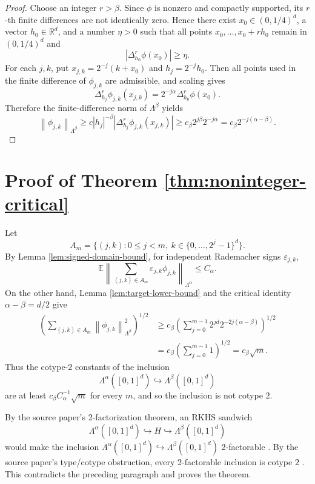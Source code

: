 \documentclass[11pt]{article}
\newcommand{\R}{\mathbb{R}}
\newcommand{\eps}{\varepsilon}
\newcommand{\Lam}{\Lambda}
\newcommand{\norm}[1]{\left\lVert #1\right\rVert}
\newcommand{\abs}[1]{\left\lvert #1\right\rvert}
\begin{document}
\begin{proof}
Choose an integer \(r>\beta\). Since \(\phi\) is nonzero and compactly
supported, its \(r\)-th finite differences are not identically zero. Hence
there exist \(x_0\in(0,1/4)^d\), a vector \(h_0\in\R^d\), and a number
\(\eta>0\) such that all points \(x_0,\ldots,x_0+rh_0\) remain in
\((0,1/4)^d\) and
\[
  \abs{\Delta_{h_0}^r\phi(x_0)}\ge \eta .
\]
For each \(j,k\), put \(x_{j,k}=2^{-j}(k+x_0)\) and
\(h_j=2^{-j}h_0\). Then all points used in the finite difference of
\(\phi_{j,k}\) are admissible, and scaling gives
\[
  \Delta_{h_j}^r\phi_{j,k}(x_{j,k})
  =
  2^{-j\alpha}\Delta_{h_0}^r\phi(x_0).
\]
Therefore the finite-difference norm of \(\Lam^\beta\) yields
\[
  \norm{\phi_{j,k}}_{\Lam^\beta}
  \ge
  c \abs{h_j}^{-\beta}
  \abs{\Delta_{h_j}^r\phi_{j,k}(x_{j,k})}
  \ge
  c_\beta 2^{j\beta}2^{-j\alpha}
  =
  c_\beta 2^{-j(\alpha-\beta)}.
\]
\end{proof}

\section*{Proof of Theorem \ref{thm:noninteger-critical}}

Let
\[
  A_m=\{(j,k):0\le j<m,\ k\in\{0,\ldots,2^j-1\}^d\}.
\]
By Lemma \ref{lem:signed-domain-bound}, for independent Rademacher signs
\(\eps_{j,k}\),
\[
  \mathbb{E}
  \left\|
    \sum_{(j,k)\in A_m}\eps_{j,k}\phi_{j,k}
  \right\|_{\Lam^\alpha}
  \le C_\alpha .
\]
On the other hand, Lemma \ref{lem:target-lower-bound} and the critical
identity \(\alpha-\beta=d/2\) give
\[
\begin{aligned}
  \left(
    \sum_{(j,k)\in A_m}
    \norm{\phi_{j,k}}_{\Lam^\beta}^2
  \right)^{1/2}
  &\ge
  c_\beta
  \left(
    \sum_{j=0}^{m-1}2^{jd}2^{-2j(\alpha-\beta)}
  \right)^{1/2}  \\
  &=
  c_\beta
  \left(
    \sum_{j=0}^{m-1}1
  \right)^{1/2}
  =
  c_\beta\sqrt m .
\end{aligned}
\]
Thus the cotype-2 constants of the inclusion
\[
  \Lam^\alpha([0,1]^d)\hookrightarrow \Lam^\beta([0,1]^d)
\]
are at least \(c_\beta C_\alpha^{-1}\sqrt m\) for every \(m\), and so the
inclusion is not cotype \(2\).

By the source paper's 2-factorization theorem, an RKHS sandwich
\[
  \Lam^\alpha([0,1]^d)\hookrightarrow H
  \hookrightarrow \Lam^\beta([0,1]^d)
\]
would make the inclusion
\(\Lam^\alpha([0,1]^d)\hookrightarrow \Lam^\beta([0,1]^d)\) 2-factorable
\cite[Theorem 6]{SS}. By the source paper's type/cotype obstruction, every
2-factorable inclusion is cotype \(2\) \cite[Lemma 5 and Corollary 8]{SS}.
This contradicts the preceding paragraph and proves the theorem.
\end{document}
